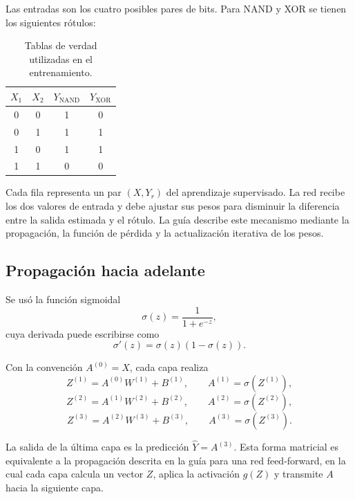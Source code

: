 \documentclass[14pt,twoside]{article}
\begin{document}
Las entradas son los cuatro posibles pares de bits. Para NAND y XOR se tienen los siguientes rótulos:

\begin{table}[H]
\centering
\caption{Tablas de verdad utilizadas en el entrenamiento.}
\begin{tabular}{cc|cc}
\toprule
$X_1$ & $X_2$ & $Y_{\mathrm{NAND}}$ & $Y_{\mathrm{XOR}}$ \\
\midrule
0 & 0 & 1 & 0 \\
0 & 1 & 1 & 1 \\
1 & 0 & 1 & 1 \\
1 & 1 & 0 & 0 \\
\bottomrule
\end{tabular}
\end{table}

Cada fila representa un par $(X,Y_r)$ del aprendizaje supervisado. La red recibe los dos valores de entrada y debe ajustar sus pesos para disminuir la diferencia entre la salida estimada y el rótulo. La guía describe este mecanismo mediante la propagación, la función de pérdida y la actualización iterativa de los pesos. \cite{martinez2026}

\subsection{Propagación hacia adelante}

Se usó la función sigmoidal
\[
\sigma(z)=\frac{1}{1+e^{-z}},
\]
cuya derivada puede escribirse como
\[
\sigma'(z)=\sigma(z)\left(1-\sigma(z)\right).
\]

Con la convención $A^{(0)}=X$, cada capa realiza
\[
Z^{(1)}=A^{(0)}W^{(1)}+B^{(1)},
\qquad
A^{(1)}=\sigma\left(Z^{(1)}\right),
\]
\[
Z^{(2)}=A^{(1)}W^{(2)}+B^{(2)},
\qquad
A^{(2)}=\sigma\left(Z^{(2)}\right),
\]
\[
Z^{(3)}=A^{(2)}W^{(3)}+B^{(3)},
\qquad
A^{(3)}=\sigma\left(Z^{(3)}\right).
\]

La salida de la última capa es la predicción $\widehat{Y}=A^{(3)}$. Esta forma matricial es equivalente a la propagación descrita en la guía para una red feed-forward, en la cual cada capa calcula un vector $Z$, aplica la activación $g(Z)$ y transmite $A$ hacia la siguiente capa. \cite{martinez2026}
\end{document}
